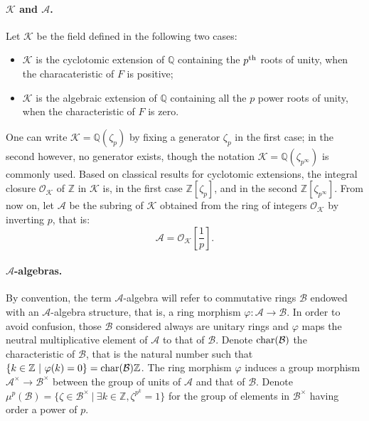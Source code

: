 \documentclass[11pt]{article}
\theoremstyle{plain}
\theoremstyle{definition}
\theoremstyle{plain}
\theoremstyle{definition}
\theoremstyle{plain}
\begin{document}
\paragraph{$\mathcal{K}$ and $\mathcal{A}$.} Let $\mathcal{K}$ be the field defined in the following two cases:
\begin{itemize}[$\bullet$]
\item $\mathcal{K}$ is the cyclotomic extension of $\mathbb{Q}$ containing the $p^{\textup{th}}$ roots of unity, when the characateristic of $F$ is positive;
\item $\mathcal{K}$ is the algebraic extension of $\mathbb{Q}$ containing all the $p$ power roots of unity, when the characteristic of $F$ is zero.
\end{itemize}
One can write $\mathcal{K} = \mathbb{Q}(\zeta_p)$ by fixing a generator $\zeta_p$ in the first case; in the second however, no generator exists, though the notation $\mathcal{K} = \mathbb{Q}(\zeta_{p^\infty})$ is commonly used. Based on classical results for cyclotomic extensions, the integral closure $\mathcal{O}_\mathcal{K}$ of $\mathbb{Z}$ in $\mathcal{K}$ is, in the first case $\mathbb{Z}[\zeta_p]$, and in the second $\mathbb{Z}[\zeta_{p^\infty}]$. From now on, let $\mathcal{A}$ be the subring of $\mathcal{K}$ obtained from the ring of integers $\mathcal{O}_\mathcal{K}$ by inverting $p$, that is:
$$\mathcal{A} = \mathcal{O}_\mathcal{K}\left[ \frac{1}{p} \right].$$

\paragraph{$\mathcal{A}$-algebras.} By convention, the term $\mathcal{A}$-algebra will refer to commutative rings $\mathcal{B}$ endowed with an $\mathcal{A}$-algebra structure, that is, a ring morphism $\varphi : \mathcal{A} \to \mathcal{B}$. In order to avoid confusion, those $\mathcal{B}$ considered always are unitary rings and $\varphi$ maps the neutral multiplicative element of $\mathcal{A}$ to that of $\mathcal{B}$. Denote $\textup{char}(\mathcal{B})$ the characteristic of $\mathcal{B}$, that is the natural number such that $\{ k \in \mathbb{Z} \ | \ \varphi(k)=0\} = \textup{char}(\mathcal{B}) \mathbb{Z}$. The ring morphism $\varphi$ induces a group morphism $\mathcal{A}^\times \to \mathcal{B}^\times$ between the group of units of $\mathcal{A}$ and that of $\mathcal{B}$. Denote $\mu^p(\mathcal{B}) = \{ \zeta \in \mathcal{B}^\times \ | \ \exists k \in \mathbb{Z}, \zeta^{p^k}=1 \}$ for the group of elements in $\mathcal{B}^\times$ having order a power of $p$.
\end{document}
